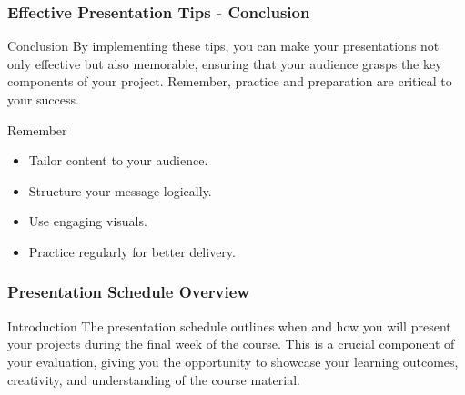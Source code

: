 \documentclass[aspectratio=169]{beamer}
\begin{document}
\begin{frame}[fragile]
    \frametitle{Effective Presentation Tips - Conclusion}
    \begin{block}{Conclusion}
        By implementing these tips, you can make your presentations not only effective but also memorable, ensuring that your audience grasps the key components of your project. Remember, practice and preparation are critical to your success.
    \end{block}

    \begin{alertblock}{Remember}
        \begin{itemize}
            \item Tailor content to your audience.
            \item Structure your message logically.
            \item Use engaging visuals.
            \item Practice regularly for better delivery.
        \end{itemize}
    \end{alertblock}
\end{frame}

\begin{frame}[fragile]
    \frametitle{Presentation Schedule Overview}
    \begin{block}{Introduction}
    The presentation schedule outlines when and how you will present your projects during the final week of the course. This is a crucial component of your evaluation, giving you the opportunity to showcase your learning outcomes, creativity, and understanding of the course material.
    \end{block}
\end{frame}
\end{document}
